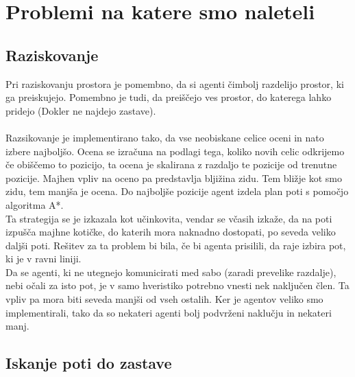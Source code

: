 \documentclass[12pt,a4paper,openany]{book}
\begin{document}
\chapter{Problemi na katere smo naleteli}

\section{Raziskovanje}
Pri raziskovanju prostora je pomembno, da si agenti čimbolj razdelijo prostor, ki ga preiskujejo. Pomembno je tudi,
da preiščejo ves prostor, do katerega lahko pridejo (Dokler ne najdejo zastave).\\
\\
Razsikovanje je implementirano tako, da vse neobiskane celice oceni in nato izbere najboljšo. Ocena se izračuna na 
podlagi tega, koliko novih celic odkrijemo če obiščemo to pozicijo, ta ocena je skalirana z razdaljo te pozicije od 
trenutne pozicije. Majhen vpliv na oceno pa predstavlja bljižina zidu. Tem bližje kot smo zidu, tem manjša je ocena. 
Do najboljše pozicije agent izdela plan poti s pomočjo algoritma A*.\\
Ta strategija se je izkazala kot učinkovita, vendar se včasih izkaže, da na poti izpušča majhne kotičke, do katerih 
mora naknadno dostopati, po seveda veliko daljši poti. Rešitev za ta problem bi bila, če bi agenta prisilili, da raje 
izbira pot, ki je v ravni liniji.\\
Da se agenti, ki ne utegnejo komunicirati med sabo (zaradi prevelike razdalje), nebi očali za isto pot, je v samo 
hveristiko potrebno vnesti nek naključen člen. Ta vpliv pa mora biti seveda manjši od vseh ostalih. Ker je 
agentov veliko smo implementirali, tako da so nekateri agenti bolj podvrženi naklučju in nekateri manj.

\section{Iskanje poti do zastave}
\end{document}
